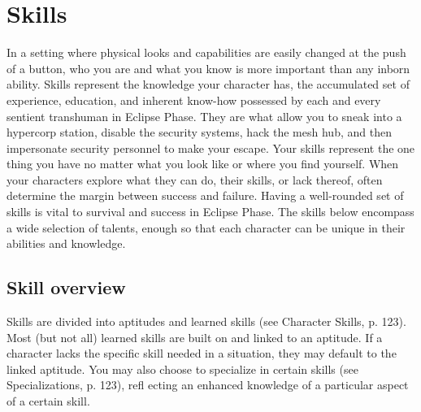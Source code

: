 \chapter{Skills}
\label{chap:skills}

In a setting where physical looks and capabilities are
easily changed at the push of a button, who you are and
what you know is more important than any inborn ability.
Skills represent the knowledge your character has,
the accumulated set of experience, education, and inherent
know-how possessed by each and every sentient
transhuman in Eclipse Phase. They are what allow you
to sneak into a hypercorp station, disable the security
systems, hack the mesh hub, and then impersonate security
personnel to make your escape. Your skills represent
the one thing you have no matter what you look like or
where you find yourself. When your characters explore
what they can do, their skills, or lack thereof, often determine
the margin between success and failure.
Having a well-rounded set of skills is vital to survival
and success in Eclipse Phase. The skills below encompass
a wide selection of talents, enough so that each character
can be unique in their abilities and knowledge.

\section{Skill overview}
Skills are divided into aptitudes and learned skills (see
Character Skills, p. 123). Most (but not all) learned
skills are built on and linked to an aptitude. If a
character lacks the specific skill needed in a situation,
they may default to the linked aptitude. You may also
choose to specialize in certain skills (see Specializations,
p. 123), refl ecting an enhanced knowledge of a
particular aspect of a certain skill.

